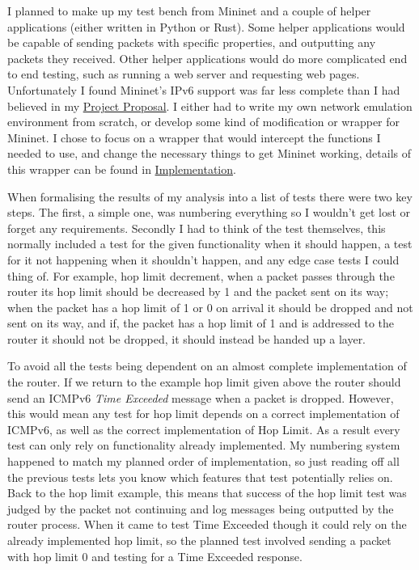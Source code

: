 \documentclass[12pt,a4paper,twoside,openright]{report}
\begin{document}
\bigskip

I planned to make up my test bench from Mininet and a couple of helper applications (either written in Python or Rust).  Some helper applications would be capable of sending packets with specific properties, and outputting any packets they received. Other helper applications would do more complicated end to end testing, such as running a web server and requesting web pages.  Unfortunately I found Mininet's IPv6 support was far less complete than I had believed in my \hyperref[project_proposal]{Project Proposal}.  I either had to write my own network emulation environment from scratch, or develop some kind of modification or wrapper for Mininet.  I chose to focus on a wrapper that would intercept the functions I needed to use, and change the necessary things to get Mininet working, details of this wrapper can be found in \hyperref[chap::implementation]{Implementation}.

\bigskip

When formalising the results of my analysis into a list of tests there were two key steps. The first, a simple one, was numbering everything so I wouldn't get lost or forget any requirements.  Secondly I had to think of the test themselves, this normally included a test for the given functionality when it should happen, a test for it not happening when it shouldn't happen, and any edge case tests I could thing of.  For example, hop limit decrement, when a packet passes through the router its hop limit should be decreased by 1 and the packet sent on its way; when the packet has a hop limit of 1 or 0 on arrival it should be dropped and not sent on its way, and if, the packet has a hop limit of 1 and is addressed to the router it should not be dropped, it should instead be handed up a layer. 

\bigskip

To avoid all the tests being dependent on an almost complete implementation of the router. If we return to the example hop limit given above the router should send an ICMPv6 \textit{Time Exceeded} message when a packet is dropped.  However, this would mean any test for hop limit depends on a correct implementation of ICMPv6, as well as the correct implementation of Hop Limit.  As a result every test can only rely on functionality already implemented.  My numbering system happened to match my planned order of implementation, so just reading off all the previous tests lets you know which features that test potentially relies on.  Back to the hop limit example, this means that success of the hop limit test was judged by the packet not continuing and log messages being outputted by the router process. When it came to test Time Exceeded though it could rely on the already implemented hop limit, so the planned test involved sending a packet with hop limit 0 and testing for a Time Exceeded response.
\end{document}
